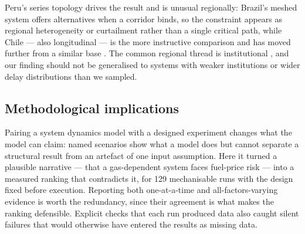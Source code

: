 Peru's series topology drives the result and is unusual regionally: Brazil's meshed
system offers alternatives when a corridor binds, so the constraint appears as regional
heterogeneity \citep{dasilva2025} or curtailment \citep{herrera2019} rather than a
single critical path, while Chile --- also longitudinal --- is the more instructive
comparison and has moved further from a similar base \citep{reyes2025}. The common
regional thread is institutional \citep{guliev2022,sempertegui2017,boateng2026}, and
our finding should not be generalised to systems with weaker institutions or wider
delay distributions than we sampled.

\subsection{Methodological implications}

Pairing a system dynamics model with a designed experiment changes what the model can
claim: named scenarios show what a model does but cannot separate a structural result
from an artefact of one input assumption. Here it turned a plausible narrative --- that
a gas-dependent system faces fuel-price risk --- into a measured ranking that
contradicts it, for 129 mechanisable runs with the design fixed before execution.
Reporting both one-at-a-time and all-factors-varying evidence is worth the redundancy,
since their agreement is what makes the ranking defensible. Explicit checks
that each run produced data also caught silent failures that would otherwise have
entered the results as missing data.
